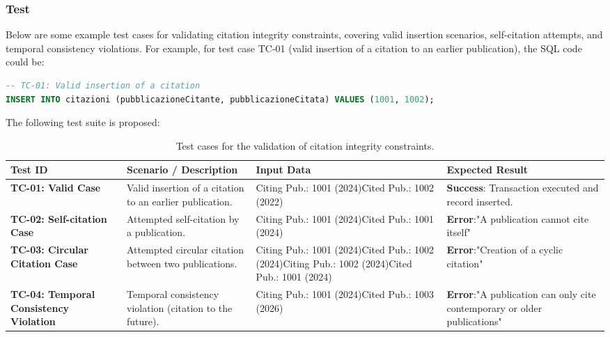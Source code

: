 \documentclass[a4paper,12pt]{article}
\begin{document}
\subsubsection*{Test}
Below are some example test cases for validating citation integrity constraints, covering valid insertion scenarios, self-citation attempts, and temporal consistency violations.
For example, for test case TC-01 (valid insertion of a citation to an earlier publication), the SQL code could be:

\begin{lstlisting}[language=SQL]
-- TC-01: Valid insertion of a citation
INSERT INTO citazioni (pubblicazioneCitante, pubblicazioneCitata) VALUES (1001, 1002);
\end{lstlisting}

The following test suite is proposed:
\begin{table}[htbp]
\centering
\small
\caption{Test cases for the validation of citation integrity constraints.}
\label{tab:test_cases_citations}
\begin{tabularx}{\textwidth}{X X X X}
\toprule
\textbf{Test ID} & \textbf{Scenario / Description} & \textbf{Input Data} & \textbf{Expected Result} \\ 
\midrule
\textbf{TC-01: Valid Case} & 
Valid insertion of a citation to an earlier publication. & 
Citing Pub.: 1001 (2024)\newline Cited Pub.: 1002 (2022) & 
\textbf{Success}: Transaction executed and record inserted. \\ 
\midrule
\textbf{TC-02: Self-citation Case} & 
Attempted self-citation by a publication. & 
Citing Pub.: 1001 (2024)\newline Cited Pub.: 1001 (2024) & 
\textbf{Error}:\newline "A publication cannot cite itself" \\ 
\midrule
\textbf{TC-03: Circular Citation Case} & 
Attempted circular citation between two publications. & 
Citing Pub.: 1001 (2024)\newline Cited Pub.: 1002 (2024)\newline Citing Pub.: 1002 (2024)\newline Cited Pub.: 1001 (2024) & 
\textbf{Error}:\newline "Creation of a cyclic citation" \\ 
\midrule
\textbf{TC-04: Temporal Consistency Violation} & 
Temporal consistency violation (citation to the future). & 
Citing Pub.: 1001 (2024)\newline Cited Pub.: 1003 (2026) & 
\textbf{Error}:\newline "A publication can only cite contemporary or older publications" \\ 
\bottomrule
\end{tabularx}
\end{table}
\end{document}
